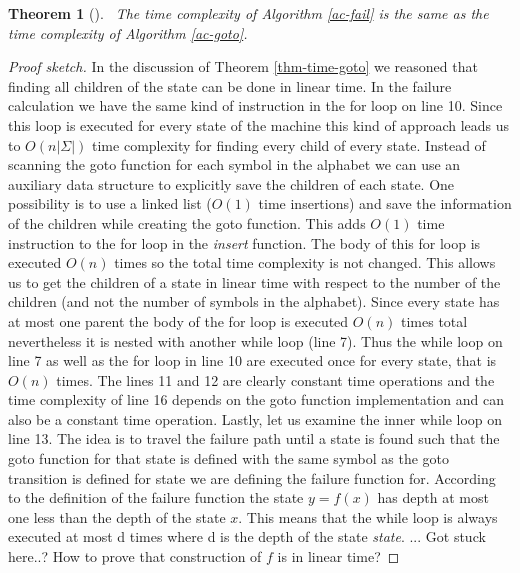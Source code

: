 \documentclass[english,twoside,censored,csm,algorithms-track-2020]{HYthesisML}
\theoremstyle{plain}
\newtheorem{theorem}{Theorem}[chapter]
\theoremstyle{definition}
\begin{document}
\begin{theorem}[]~\label{thm-time-failure}
    The time complexity of Algorithm \ref{ac-fail} is the same as the time complexity of
  Algorithm \ref{ac-goto}.
\end{theorem}
\begin{proof}[Proof sketch]
In the discussion of Theorem
\ref{thm-time-goto} we reasoned that finding all children of the state can be done in
linear time. In the failure calculation we have the same kind of instruction in the for loop
on line 10. Since this loop is executed for every state of the machine this kind of approach leads
us to $O(n|\Sigma|)$ time complexity for finding every child of every state. Instead of scanning
the goto function for each symbol in the alphabet we can use an auxiliary data structure to
explicitly save the children of each state. One possibility is to use a linked list ($O(1)$ time
insertions) and save the information of the children while creating the goto function. This adds
$O(1)$ time instruction to the for loop in the \textit{insert} function. The body of this for loop
is executed $O(n)$ times so the total time complexity is not changed. This allows us to get the
children of a state in linear time with respect to the number of the children (and not the number of
symbols in the alphabet). Since every state
has at most one parent the body of the for loop is executed $O(n)$ times total nevertheless it
is nested with another while loop (line 7). Thus the while loop on line 7 as well as the for loop in
line 10 are executed once for every state, that is $O(n)$ times. The lines 11 and 12 are clearly constant
time operations and the time complexity of line 16 depends on the goto function implementation and
can also be a constant time operation. Lastly, let us examine the inner while loop on line 13.
The idea is to travel the failure path until a state is found such that the goto function
for that state is defined with the same symbol as the goto transition is defined for state we are
defining the failure function for. According to the definition of the failure function the state
$y=f(x)$ has depth at most one less than the depth of the state $x$. This means that the while
loop is always executed at most d times where d is the depth of the state \textit{state}.
... Got stuck here..? How to prove that construction of $f$ is in linear time?

\end{proof}

\end{document}
